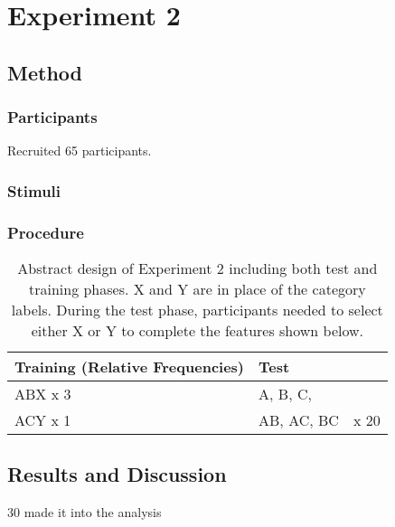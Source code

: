 \documentclass[10pt,letterpaper]{article}
\begin{document}
\section{Experiment 2}

\subsection{Method}


\subsubsection*{Participants}

Recruited 65 participants.

\subsubsection*{Stimuli}

\subsubsection*{Procedure}

\begin{table}[!ht]
  \begin{center}
    \caption{Abstract design of Experiment 2 including both test and training phases. X and Y are in place of the category labels. During the test phase, participants needed to select either X or Y to complete the features shown below.\\}
    \label{tab:abstract-exp2}
    \begin{tabular}{llr} %
      \textbf{Training (Relative Frequencies)} & \textbf{Test}& \\
      \hline
      ABX x 3 &  A, B, C,         &  \\
      ACY x 1 &  AB, AC, BC      & x 20 \\
      \hline
    \end{tabular}
  \end{center}
\end{table}


\subsection{Results and Discussion}

30 made it into the analysis
\end{document}
